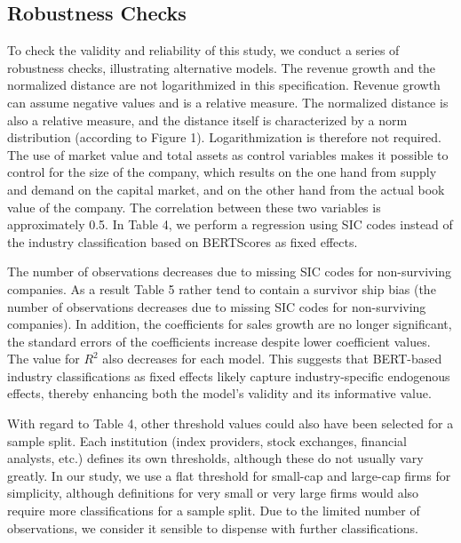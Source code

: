 \documentclass[
]{article}
\begin{document}
\subsection{Robustness Checks}\label{robustness-checks}

To check the validity and reliability of this study, we conduct a series
of robustness checks, illustrating alternative models. The revenue
growth and the normalized distance are not logarithmized in this
specification. Revenue growth can assume negative values and is a
relative measure. The normalized distance is also a relative measure,
and the distance itself is characterized by a norm distribution
(according to Figure 1). Logarithmization is therefore not required. The
use of market value and total assets as control variables makes it
possible to control for the size of the company, which results on the
one hand from supply and demand on the capital market, and on the other
hand from the actual book value of the company. The correlation between
these two variables is approximately 0.5. In Table 4, we perform a
regression using SIC codes instead of the industry classification based
on BERTScores as fixed effects.

The number of observations decreases due to missing SIC codes for
non-surviving companies. As a result Table 5 rather tend to contain a
survivor ship bias (the number of observations decreases due to missing
SIC codes for non-surviving companies). In addition, the coefficients
for sales growth are no longer significant, the standard errors of the
coefficients increase despite lower coefficient values. The value for
\(R^2\) also decreases for each model. This suggests that BERT-based
industry classifications as fixed effects likely capture
industry-specific endogenous effects, thereby enhancing both the model's
validity and its informative value.

With regard to Table 4, other threshold values could also have been
selected for a sample split. Each institution (index providers, stock
exchanges, financial analysts, etc.) defines its own thresholds,
although these do not usually vary greatly. In our study, we use a flat
threshold for small-cap and large-cap firms for simplicity, although
definitions for very small or very large firms would also require more
classifications for a sample split. Due to the limited number of
observations, we consider it sensible to dispense with further
classifications.
\end{document}
